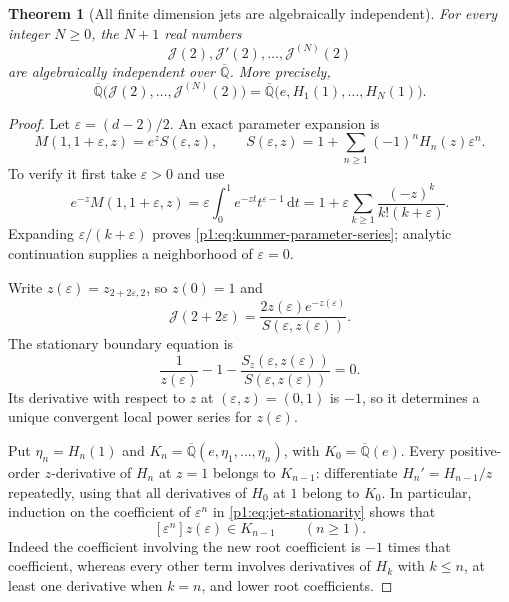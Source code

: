 \documentclass[11pt,a4paper]{article}
\newtheorem{theorem}{Theorem}[section]
\theoremstyle{definition}
\theoremstyle{remark}
\numberwithin{equation}{section}
\begin{document}
\begin{theorem}[All finite dimension jets are algebraically independent]
\label{p1:thm:all-dimension-jets}
For every integer $N\ge0$, the $N+1$ real numbers
\[
 \mathcal J(2),\mathcal J'(2),\ldots,\mathcal J^{(N)}(2)
\]
are algebraically independent over $\overline{\mathbb Q}$.
More precisely,
\begin{equation}\label{p1:eq:jet-field-equality}
 \overline{\mathbb Q}\bigl(\mathcal J(2),\ldots,
                  \mathcal J^{(N)}(2)\bigr)
 =\overline{\mathbb Q}\bigl(e,H_1(1),\ldots,H_N(1)\bigr).
\end{equation}
\end{theorem}
\begin{proof}
Let $\varepsilon=(d-2)/2$. An exact parameter expansion is
\begin{equation}\label{p1:eq:kummer-parameter-series}
 M(1,1+\varepsilon,z)
 =e^zS(\varepsilon,z),\qquad
 S(\varepsilon,z)=1+\sum_{n\ge1}(-1)^nH_n(z)\varepsilon^n.
\end{equation}
To verify it first take $\varepsilon>0$ and use
\[
 e^{-z}M(1,1+\varepsilon,z)
 =\varepsilon\int_0^1e^{-zt}t^{\varepsilon-1}\,\mathrm dt
 =1+\varepsilon\sum_{k\ge1}\frac{(-z)^k}{k!(k+\varepsilon)}.
\]
Expanding $\varepsilon/(k+\varepsilon)$ proves
\eqref{p1:eq:kummer-parameter-series}; analytic continuation supplies a
neighborhood of $\varepsilon=0$.

Write $z(\varepsilon)=z_{2+2\varepsilon,2}$, so $z(0)=1$ and
\[
 \mathcal J(2+2\varepsilon)
 =\frac{2z(\varepsilon)e^{-z(\varepsilon)}}
              {S(\varepsilon,z(\varepsilon))}.
\]
The stationary boundary equation is
\begin{equation}\label{p1:eq:jet-stationarity}
 \frac1{z(\varepsilon)}-1
 -\frac{S_z(\varepsilon,z(\varepsilon))}
       {S(\varepsilon,z(\varepsilon))}=0.
\end{equation}
Its derivative with respect to $z$ at $(\varepsilon,z)=(0,1)$ is
$-1$, so it determines a unique convergent local power series for
$z(\varepsilon)$.

Put $\eta_n=H_n(1)$ and
$K_n=\overline{\mathbb Q}(e,\eta_1,\ldots,\eta_n)$, with
$K_0=\overline{\mathbb Q}(e)$. Every positive-order $z$-derivative of
$H_n$ at $z=1$ belongs to $K_{n-1}$: differentiate
$H_n'=H_{n-1}/z$ repeatedly, using that all derivatives of $H_0$
at $1$ belong to $K_0$. In particular, induction on the coefficient of
$\varepsilon^n$ in \eqref{p1:eq:jet-stationarity} shows that
\begin{equation}\label{p1:eq:root-jet-triangular}
 [\varepsilon^n]z(\varepsilon)\in K_{n-1}\qquad(n\ge1).
\end{equation}
Indeed the coefficient involving the new root coefficient is $-1$
times that coefficient, whereas every other term involves derivatives
of $H_k$ with $k\le n$, at least one derivative when $k=n$, and lower
root coefficients.


\end{proof}
\end{document}
